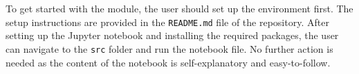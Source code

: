 To get started with the module, the user should set up the environment first. The setup instructions are provided in the \texttt{README.md} file of the repository. After setting up the Jupyter notebook and installing the required packages, the user can navigate to the \texttt{src} folder and run the notebook file. No further action is needed as the content of the notebook is self-explanatory and easy-to-follow.

\clearpage

%



